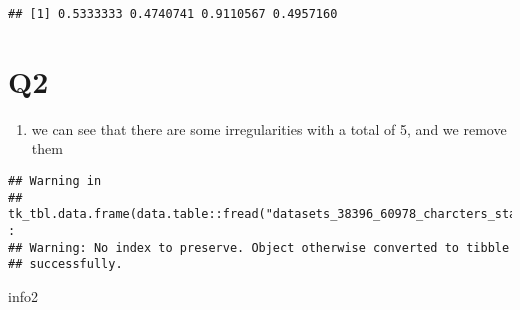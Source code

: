 \documentclass[]{article}
\newenvironment{Shaded}{\begin{snugshade}}{\end{snugshade}}
\newcommand{\DataTypeTok}[1]{\textcolor[rgb]{0.13,0.29,0.53}{#1}}
\newcommand{\FloatTok}[1]{\textcolor[rgb]{0.00,0.00,0.81}{#1}}
\newcommand{\KeywordTok}[1]{\textcolor[rgb]{0.13,0.29,0.53}{\textbf{#1}}}
\newcommand{\NormalTok}[1]{#1}
\newcommand{\OperatorTok}[1]{\textcolor[rgb]{0.81,0.36,0.00}{\textbf{#1}}}
\newcommand{\StringTok}[1]{\textcolor[rgb]{0.31,0.60,0.02}{#1}}
\providecommand{\tightlist}{%
  \setlength{\itemsep}{0pt}\setlength{\parskip}{0pt}}
\begin{document}
\begin{verbatim}
## [1] 0.5333333 0.4740741 0.9110567 0.4957160
\end{verbatim}

\hypertarget{q2}{%
\section{Q2}\label{q2}}

\begin{enumerate}
\def\labelenumi{\arabic{enumi}.}
\tightlist
\item
  we can see that there are some irregularities with a total of 5, and
  we remove them
\end{enumerate}

\begin{Shaded}
\end{Shaded}

\begin{verbatim}
## Warning in
## tk_tbl.data.frame(data.table::fread("datasets_38396_60978_charcters_stats.csv", :
## Warning: No index to preserve. Object otherwise converted to tibble
## successfully.
\end{verbatim}

\begin{Shaded}
\begin{Highlighting}[]
\NormalTok{info2}
\end{Highlighting}
\end{Shaded}
\end{document}
